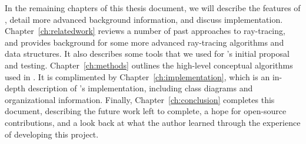 In the remaining chapters of this thesis document, we will describe the features of \name, detail more advanced background information, and discuss implementation.
Chapter~\ref{ch:relatedwork} reviews a number of past approaches
to ray-tracing, and provides background for some more advanced ray-tracing algorithms and data structures.
It also describes some tools that we used for \name's initial proposal and testing.
Chapter~\ref{ch:methods} outlines the high-level conceptual algorithms used in \name.
It is complimented by Chapter~\ref{ch:implementation}, which is an in-depth description of \name's implementation, including class diagrams and organizational information.
Finally, Chapter~\ref{ch:conclusion} completes this document, describing the future work left to complete, a hope for open-source contributions, and a look back at what the author learned through the experience of developing this project.
